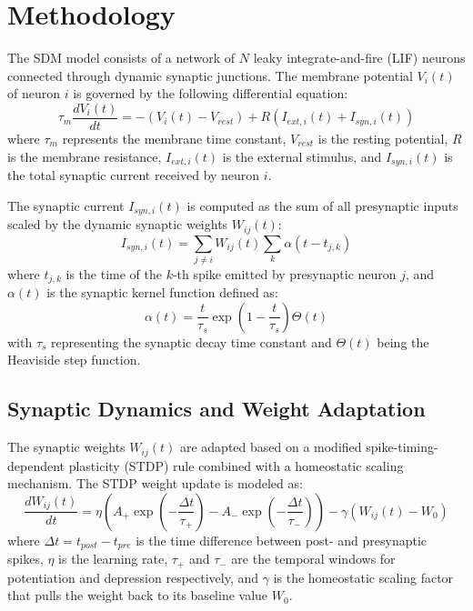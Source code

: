 \section{Methodology}
The SDM model consists of a network of $N$ leaky integrate-and-fire (LIF) neurons connected through dynamic synaptic junctions.
The membrane potential $V_i(t)$ of neuron $i$ is governed by the following differential equation:
\begin{equation}
\tau_m \frac{dV_i(t)}{dt} = -(V_i(t) - V_{rest}) + R \left( I_{ext,i}(t) + I_{syn,i}(t) \right)
\label{eq:membrane}
\end{equation}
where $\tau_m$ represents the membrane time constant, $V_{rest}$ is the resting potential, $R$ is the membrane resistance, $I_{ext,i}(t)$ is the external stimulus, and $I_{syn,i}(t)$ is the total synaptic current received by neuron $i$.

The synaptic current $I_{syn,i}(t)$ is computed as the sum of all presynaptic inputs scaled by the dynamic synaptic weights $W_{ij}(t)$:
\begin{equation}
I_{syn,i}(t) = \sum_{j \neq i} W_{ij}(t) \sum_{k} \alpha(t - t_{j,k})
\label{eq:synaptic_current}
\end{equation}
where $t_{j,k}$ is the time of the $k$-th spike emitted by presynaptic neuron $j$, and $\alpha(t)$ is the synaptic kernel function defined as:
\begin{equation}
\alpha(t) = \frac{t}{\tau_s} \exp\left(1 - \frac{t}{\tau_s}\right) \Theta(t)
\end{equation}
with $\tau_s$ representing the synaptic decay time constant and $\Theta(t)$ being the Heaviside step function.

\subsection{Synaptic Dynamics and Weight Adaptation}
The synaptic weights $W_{ij}(t)$ are adapted based on a modified spike-timing-dependent plasticity (STDP) rule combined with a homeostatic scaling mechanism.
The STDP weight update is modeled as:
\begin{equation}
\frac{dW_{ij}(t)}{dt} = \eta \left( A_+ \exp\left( - \frac{\Delta t}{\tau_+} \right) - A_- \exp\left( - \frac{\Delta t}{\tau_-} \right) \right) - \gamma (W_{ij}(t) - W_0)
\label{eq:plasticity}
\end{equation}
where $\Delta t = t_{post} - t_{pre}$ is the time difference between post- and presynaptic spikes, $\eta$ is the learning rate, $\tau_+$ and $\tau_-$ are the temporal windows for potentiation and depression respectively, and $\gamma$ is the homeostatic scaling factor that pulls the weight back to its baseline value $W_0$.

